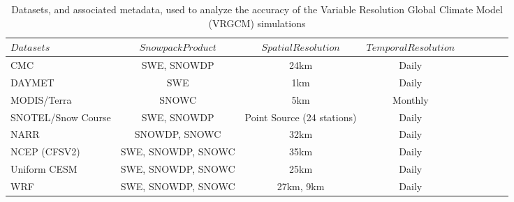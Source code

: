 \documentclass[11pt]{article}
\begin{document}
\begin{table}[t]
\caption{Datasets, and associated metadata, used to analyze the accuracy of the Variable Resolution Global Climate Model (VRGCM) simulations}\label{t1}
\begin{center}
\begin{tabular*}{\textwidth}{@{\extracolsep\fill}lcccccccc}
\hline
$Datasets$ & $Snowpack  Product$ & $ Spatial  Resolution$ & $Temporal  Resolution$ \\
\hline
 CMC & SWE, SNOWDP & 24km & Daily\\
 DAYMET & SWE & 1km & Daily \\
 MODIS/Terra & SNOWC & 5km & Monthly \\
 SNOTEL/Snow Course & SWE, SNOWDP & Point Source (24 stations) & Daily \\
 NARR & SNOWDP, SNOWC & 32km & Daily \\
 NCEP (CFSV2) & SWE, SNOWDP, SNOWC & 35km & Daily \\
 Uniform CESM & SWE, SNOWDP, SNOWC & 25km & Daily \\
 WRF & SWE, SNOWDP, SNOWC & 27km, 9km & Daily \\
\hline
\end{tabular*}
\end{center}
\end{table}
\end{document}
